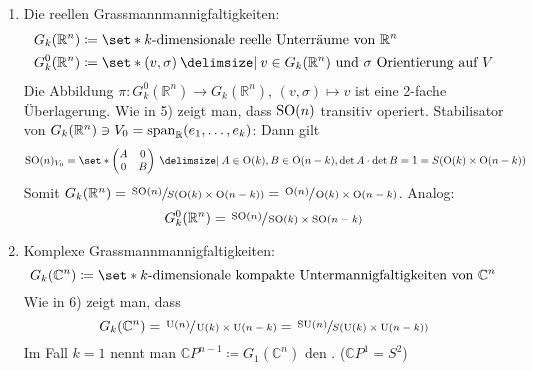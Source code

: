 \begin{beispiel*}[{name=[homogene Räume]}]
\begin{enumerate}[1)]
		Zur Standgruppe: 
		\[
			A [e_1] = [e_1] \iff A= \begin{pmatrix}
				\det \tilde{A} & 0 & \cdots & 0 \\
				0 & & & \\
				\vdots & & \tilde{A} & \\
				0 & & & 
			\end{pmatrix}\in \SO(n+1) , \tilde{A} \in \On(n)
		\]
		Somit ist die Standgruppe $\mathbb{R}P^n = \sfrac{\SO(n+1)}{O(n)}$ \enquote{größer} als $\SO(n)$.
		\begin{itemize}
			\item Achtung: Nicht alle Unterlagerungen von homogenen Räumen sind homogene Räume!
			\item $\On(n)$ ist nicht zusammenhängend!
		\end{itemize}
		\item Die reellen Grassmannmannigfaltigkeiten: 
		\begin{align}
			G_k (\mathbb{R}^n) &\coloneqq \set*{\text{$k$-dimensionale reelle Unterräume von $\mathbb{R}^n$}} \\
			G_k^0(\mathbb{R}^n) &\coloneqq \set*{(v,\sigma) \given v \in G_k(\mathbb{R}^n)} \text{ und $\sigma$ Orientierung auf $V$} 
		\end{align}
		Die Abbildung $\pi \colon G_k^0(\mathbb{R}^n) \to G_k(\mathbb{R}^n)$, $(v,\sigma) \mapsto v$ ist eine 2-fache Überlagerung.
		Wie in 5) zeigt man, dass $\SO(n)$ transitiv operiert.
		Stabilisator von $G_k(\mathbb{R}^n)\ni V_0 = \operatorname{span}_\mathbb{R}(e_1, \ldots ,e_k)$:
		Dann gilt 
		\[
			\SO(n)_{V_0} = \set*{ \begin{pmatrix}
				A & 0 \\ 0 & B
			\end{pmatrix} \given A \in \On(k), B \in \On(n-k), \det A \cdot \det B = 1} = S \enbrace*{\On(k) \times \On(n-k)}
		\]
		Somit $G_k(\mathbb{R}^n) = \sfrac{\SO(n)}{S \enbrace*{\On(k) \times \On(n-k)}} = \sfrac{\On(n)}{\On(k) \times \On(n-k)}$.
		Analog:
		\[
			G_k^0(\mathbb{R}^n) = \sfrac{\operatorname{SO}(n)}{\operatorname{SO}(k) \times \operatorname{SO}(n-k)}
		\]
		\item Komplexe Grassmannmannigfaltigkeiten: 
		\[
			G_k(\mathbb{C}^n) \coloneqq \set*{\text{$k$-dimensionale kompakte Untermannigfaltigkeiten von $\mathbb{C}^n$} }
		\]
		Wie in 6) zeigt man, dass 
		\[
			G_k(\mathbb{C}^n) = \sfrac{\operatorname{U}(n)}{\operatorname{U}(k) \times \operatorname{U}(n-k)} = \sfrac{\operatorname{SU}(n)}{S(\operatorname{U}(k) \times \operatorname{U}(n-k))}
		\]
		Im Fall $k=1$ nennt man $\mathbb{C}P^{n-1} \coloneqq G_1(\mathbb{C}^n)$ den . ($\mathbb{C}P^1 = S^2$) 

\end{enumerate}
\end{beispiel*}
